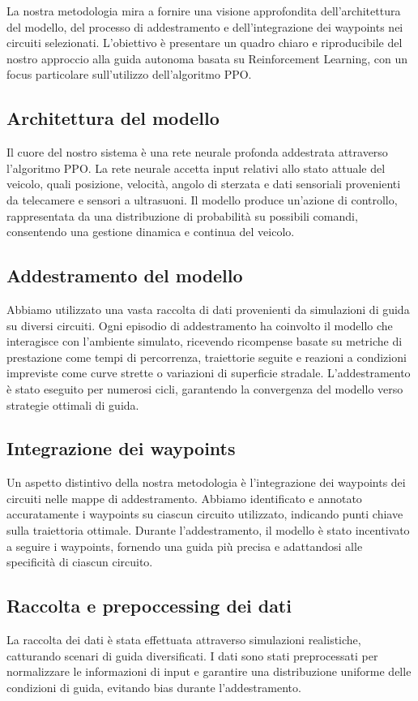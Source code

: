 \documentclass[conference]{IEEEtran}
\begin{document}
La nostra metodologia mira a fornire una visione approfondita dell'architettura del modello, del processo di addestramento e dell'integrazione dei waypoints nei circuiti selezionati. L'obiettivo è presentare un quadro chiaro e riproducibile del nostro approccio alla guida autonoma basata su Reinforcement Learning, con un focus particolare sull'utilizzo dell'algoritmo PPO.

\subsection{Architettura del modello}
Il cuore del nostro sistema è una rete neurale profonda addestrata attraverso l'algoritmo PPO. La rete neurale accetta input relativi allo stato attuale del veicolo, quali posizione, velocità, angolo di sterzata e dati sensoriali provenienti da telecamere e sensori a ultrasuoni. Il modello produce un'azione di controllo, rappresentata da una distribuzione di probabilità su possibili comandi, consentendo una gestione dinamica e continua del veicolo.

\subsection{Addestramento del modello}
Abbiamo utilizzato una vasta raccolta di dati provenienti da simulazioni di guida su diversi circuiti. Ogni episodio di addestramento ha coinvolto il modello che interagisce con l'ambiente simulato, ricevendo ricompense basate su metriche di prestazione come tempi di percorrenza, traiettorie seguite e reazioni a condizioni impreviste come curve strette o variazioni di superficie stradale. L'addestramento è stato eseguito per numerosi cicli, garantendo la convergenza del modello verso strategie ottimali di guida.

\subsection{Integrazione dei waypoints}

Un aspetto distintivo della nostra metodologia è l'integrazione dei waypoints dei circuiti nelle mappe di addestramento.
%
Abbiamo identificato e annotato accuratamente i waypoints su ciascun circuito utilizzato, indicando punti chiave sulla traiettoria ottimale.
%
Durante l'addestramento, il modello è stato incentivato a seguire i waypoints, fornendo una guida più precisa e adattandosi alle specificità di ciascun circuito.

\subsection{Raccolta e prepoccessing dei dati}
La raccolta dei dati è stata effettuata attraverso simulazioni realistiche, catturando scenari di guida diversificati. I dati sono stati preprocessati per normalizzare le informazioni di input e garantire una distribuzione uniforme delle condizioni di guida, evitando bias durante l'addestramento.
\end{document}
